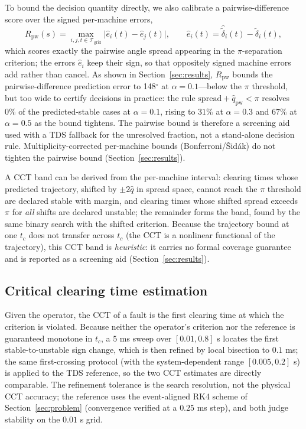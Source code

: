 \documentclass[5p,times]{elsarticle}
\newcommand{\pairq}{148}              %
\newcommand{\decfrac}{0\%}            %
\begin{document}
To bound the decision quantity directly, we also calibrate a pairwise-difference score over the
signed per-machine errors,
\begin{equation}
R_{\mathrm{pw}}(s) = \max_{i,j,t\in\mathcal{T}_{\mathrm{grid}}} \bigl| \hat e_i(t) - \hat e_j(t) \bigr|, \qquad
\hat e_i(t) = \hat{\tilde\delta}_i(t) - \tilde\delta_i(t),
\end{equation}
which scores exactly the pairwise angle spread appearing in the $\pi$-separation criterion; the
errors $\hat e_i$ keep their sign, so that oppositely signed machine errors add rather than
cancel. As shown in Section~\ref{sec:results}, $R_{\mathrm{pw}}$ bounds the pairwise-difference
prediction error to \pairq{}$^\circ$ at $\alpha{=}0.1$---below the $\pi$ threshold, but too wide to certify decisions
in practice: the rule $\mathrm{spread}+\hat q_{\mathrm{pw}}<\pi$ resolves \decfrac{} of the
predicted-stable cases at $\alpha{=}0.1$, rising to $31\%$ at $\alpha{=}0.3$ and $67\%$ at
$\alpha{=}0.5$ as the bound tightens. The pairwise bound is therefore a screening aid used with a
TDS fallback for the unresolved fraction, not a stand-alone decision rule. Multiplicity-corrected
per-machine bounds (Bonferroni/\v{S}id\'ak) do not tighten the pairwise bound
(Section~\ref{sec:results}).

A CCT band can be derived from the per-machine interval: clearing times whose predicted
trajectory, shifted by $\pm 2\hat q$ in spread space, cannot reach the $\pi$ threshold are
declared stable with margin, and clearing times whose shifted spread exceeds $\pi$ for \emph{all}
shifts are declared unstable; the remainder forms the band, found by the same binary search with
the shifted criterion. Because the trajectory bound at one $t_c$ does not transfer across $t_c$
(the CCT is a nonlinear functional of the trajectory), this CCT band is \emph{heuristic}: it
carries no formal coverage guarantee and is reported as a screening aid
(Section~\ref{sec:results}).

\subsection{Critical clearing time estimation}
Given the operator, the CCT of a fault is the first clearing time at which the criterion is
violated. Because neither the operator's criterion nor the reference is guaranteed monotone in
$t_c$, a $5$ ms sweep over $[0.01,0.8]$ s locates the first stable-to-unstable sign change, which
is then refined by local bisection to $0.1$ ms; the same first-crossing protocol (with the
system-dependent range $[0.005,0.2]$ s) is applied to the TDS reference, so the two CCT estimates
are directly comparable. The refinement tolerance is the search resolution, not the physical CCT
accuracy; the reference uses the event-aligned RK4 scheme of Section~\ref{sec:problem}
(convergence verified at a $0.25$ ms step), and both judge stability on the $0.01$ s grid.
\end{document}
